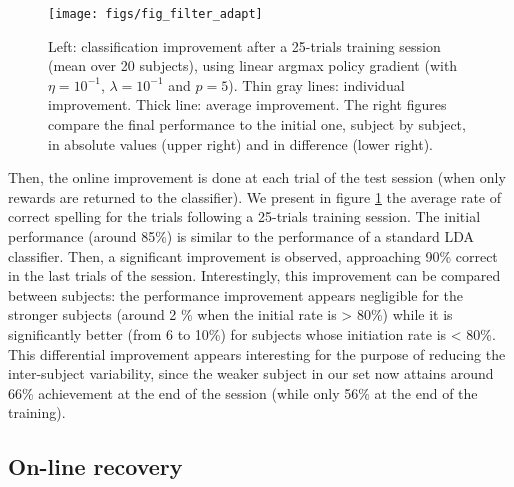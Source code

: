 \documentclass[conference]{IEEEtran}
\begin{document}
\begin{figure}
\centerline{
 \texttt{[image: figs/fig\_filter\_adapt]}
}
\caption{Left: classification improvement after a 25-trials training session (mean over 20 subjects), 
using linear argmax policy gradient (with $\eta = 10^{-1}$, $\lambda = 10^{-1}$ and $p=5$). 
Thin gray lines: individual improvement. Thick line: average improvement. The right figures compare the 
final performance to the initial one, subject by subject, in absolute values (upper right) and in
difference (lower right).}
\label{fig:filter_adapt}
\end{figure}

Then, the online improvement
is done at each trial of the test session (when only rewards are returned to the classifier).
We present in figure \ref{fig:filter_adapt} the average rate of correct spelling for the trials
following a 25-trials training session. The initial performance (around 85\%) is similar to 
the performance of a standard LDA classifier. Then, a significant improvement is observed, approaching
90\% correct in the last trials of the session.
Interestingly, this improvement can be compared between subjects: the performance improvement
appears negligible for the stronger subjects (around 2 \% when the initial rate is > 80\%) while it
is significantly better (from 6 to 10\%) for subjects whose initiation rate is < 80\%. 
This differential improvement appears interesting for the purpose of reducing the inter-subject
variability, since the weaker subject in our set now attains around 66\% achievement at the end of the session
(while only 56\% at the end of the training). 


\subsection{On-line recovery} \label{sec:sp_filt_rec}
\end{document}
